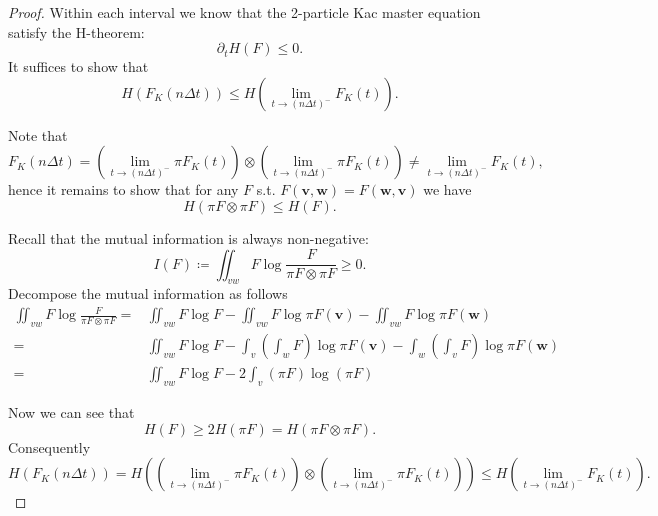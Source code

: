 \documentclass[10pt,a4paper]{amsart}
\begin{document}
\begin{proof}
    Within each interval we know that the 2-particle Kac master equation satisfy the H-theorem:
    \begin{equation*}
        \partial_{t} H(F) \leq 0.
    \end{equation*}
    It suffices to show that
    \begin{equation*}
        H\left(F_{K}(n\Delta t)\right)  \leq H\left(\lim_{t\rightarrow (n\Delta t)^{-}} F_{K}(t)\right).
    \end{equation*}

    Note that
    \begin{equation*}
        F_{K}(n\Delta t) = \left( \lim_{t\rightarrow (n\Delta t)^{-}}\pi F_{K}(t)\right) \otimes \left( \lim_{t\rightarrow (n\Delta t)^{-}}\pi F_{K}(t)\right) \neq \lim_{t\rightarrow (n\Delta t)^{-}} F_{K}(t),
    \end{equation*}
    hence it remains to show that for any $F$ s.t. $F(\mathbf{v}, \mathbf{w}) = F(\mathbf{w}, \mathbf{v})$ we have
    \begin{equation*}
        H(\pi F \otimes \pi F) \leq H(F).
    \end{equation*}

    Recall that the mutual information is always non-negative:
    \begin{equation*}
        I(F) \coloneqq \iint_{vw} F \log{\frac{F}{\pi F\otimes \pi F}} \geq 0.
    \end{equation*}
    Decompose the mutual information as follows
    \begin{equation*}
    \begin{split}
\iint_{vw} F \log{\frac{F}{\pi F\otimes \pi F}} = &\iint_{vw}F\log{F} - \iint_{vw} F \log{\pi F(\mathbf{v})} - \iint_{vw} F \log{\pi F(\mathbf{w})}\\
=& \iint_{vw}F\log{F} - \int_{v} \left(\int_{w}F\right) \log{\pi F(\mathbf{v})} - \int_{w} \left(\int_{v}F\right) \log{\pi F(\mathbf{w})}\\
=& \iint_{vw}F\log{F} - 2\int_{v} (\pi F) \log{(\pi F)}
    \end{split}
    \end{equation*}

    Now we can see that 
    \begin{equation*}
        H(F) \geq 2 H(\pi F) = H(\pi F \otimes \pi F).
    \end{equation*}
    Consequently
    \begin{equation*}
        H\left(F_{K}(n\Delta t)\right) = H\left(\left( \lim_{t\rightarrow (n\Delta t)^{-}}\pi F_{K}(t)\right) \otimes \left( \lim_{t\rightarrow (n\Delta t)^{-}}\pi F_{K}(t)\right)\right) \leq H\left(\lim_{t\rightarrow (n\Delta t)^{-}} F_{K}(t)\right).
    \end{equation*}


\end{proof}
\end{document}
